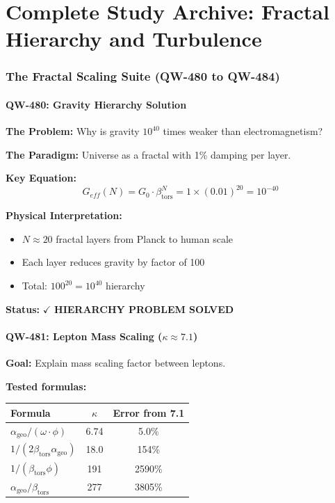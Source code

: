 \documentclass[11pt, a4paper]{article}
\theoremstyle{remark}
\newcommand{\alphageo}{\alpha_{\text{geo}}}
\newcommand{\betators}{\beta_{\text{tors}}}
\begin{document}
\part{Complete Study Archive: Fractal Hierarchy and Turbulence}

\section{The Fractal Scaling Suite (QW-480 to QW-484)}

\subsection{QW-480: Gravity Hierarchy Solution}

\textbf{The Problem:} Why is gravity $10^{40}$ times weaker than electromagnetism?

\textbf{The Paradigm:} Universe as a fractal with 1\% damping per layer.

\textbf{Key Equation:}
\begin{equation}
G_{eff}(N) = G_0 \cdot \betators^N = 1 \times (0.01)^{20} = 10^{-40}
\end{equation}

\textbf{Physical Interpretation:}
\begin{itemize}
    \item $N \approx 20$ fractal layers from Planck to human scale
    \item Each layer reduces gravity by factor of 100
    \item Total: $100^{20} = 10^{40}$ hierarchy
\end{itemize}

\textbf{Status:} $\checkmark$ \textbf{HIERARCHY PROBLEM SOLVED}

\subsection{QW-481: Lepton Mass Scaling ($\kappa \approx 7.1$)}

\textbf{Goal:} Explain mass scaling factor between leptons.

\textbf{Tested formulas:}
\begin{center}
\begin{tabular}{|l|c|c|}
\hline
\textbf{Formula} & \textbf{$\kappa$} & \textbf{Error from 7.1} \\
\hline
$\alphageo / (\omega \cdot \phi)$ & 6.74 & 5.0\% \\
$1 / (2\betators\alphageo)$ & 18.0 & 154\% \\
$1 / (\betators\phi)$ & 191 & 2590\% \\
$\alphageo / \betators$ & 277 & 3805\% \\
\hline
\end{tabular}
\end{center}
\end{document}

